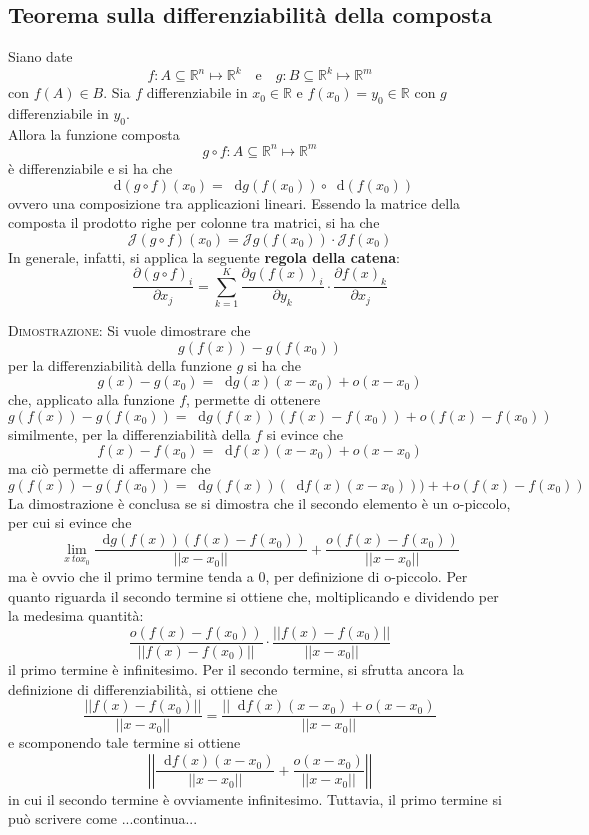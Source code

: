 \documentclass[a4paper]{extarticle}
\newcommand*\dif{\mathop{}\!\mathrm{d}}
\begin{document}
\vspace{1em}
\noindent
\subsection{Teorema sulla differenziabilità della composta}
Siano date
\[f : A \subseteq \mathbb{R}^n \longmapsto \mathbb{R}^k \hspace{1em} \text{e} \hspace{1em} g : B \subseteq \mathbb{R}^k \longmapsto \mathbb{R}^m\]
con $f(A) \in B$. Sia $f$ differenziabile in $x_0 \in \mathbb{R}$ e $f(x_0)=y_0 \in \mathbb{R}$ con $g$ differenziabile in $y_0$.\\
Allora la funzione composta
\[g \circ f : A \subseteq \mathbb{R}^n \longmapsto \mathbb{R}^m\]
è differenziabile e si ha che
\[\dif(g \circ f)(x_0) = \dif g(f(x_0)) \circ \dif(f(x_0))\]
ovvero una composizione tra applicazioni lineari. Essendo la matrice della composta il prodotto righe per colonne tra matrici, si ha che
\[\mathcal{J}(g \circ f)(x_0) = \mathcal{J}g(f(x_0)) \cdot \mathcal{J}f(x_0)\]
In generale, infatti, si applica la seguente \textbf{regola della catena}:
\[\frac{\partial (g \circ f)_i}{\partial x_j} = \sum_{k=1}^K \frac{\partial g(f(x))_i}{\partial y_k} \cdot \frac{\partial f(x)_k}{\partial x_j}\]

\vspace{2em}
\noindent
\normalfont \normalsize
\textsc{Dimostrazione}: Si vuole dimostrare che
\[g(f(x))-g(f(x_0))\]
per la differenziabilità della funzione $g$ si ha che
\[g(x) - g(x_0) = \dif g(x)(x-x_0) + o(x-x_0)\]
che, applicato alla funzione $f$, permette di ottenere
\[g(f(x)) - g(f(x_0)) = \dif g(f(x))(f(x)-f(x_0)) + o(f(x)-f(x_0))\]
similmente, per la differenziabilità della $f$ si evince che
\[f(x) - f(x_0) = \dif f(x)(x-x_0) + o(x-x_0)\]
ma ciò permette di affermare che
\[g(f(x)) - g(f(x_0)) = \dif g(f(x))(\dif f(x) (x-x_0))) + + o(f(x)-f(x_0))\]
La dimostrazione è conclusa se si dimostra che il secondo elemento è un o-piccolo, per cui si evince che
\[\lim_{x\ to x_0} \frac{\dif g(f(x))(f(x)-f(x_0))}{\vert \vert x-x_0 \vert \vert} + \frac{o \left(f(x)-f(x_0)\right)}{\vert \vert x-x_0 \vert \vert}\]
ma è ovvio che il primo termine tenda a $0$, per definizione di o-piccolo. Per quanto riguarda il secondo termine si ottiene che, moltiplicando e dividendo per la medesima quantità:
\[\frac{o \left(f(x)-f(x_0)\right)}{\vert \vert f(x) - f(x_0) \vert \vert} \cdot \frac{\vert \vert f(x) - f(x_0) \vert \vert}{\vert \vert x - x_0 \vert \vert}\]
il primo termine è infinitesimo. Per il secondo termine, si sfrutta ancora la definizione di differenziabilità, si ottiene che
\[\frac{\vert \vert f(x) - f(x_0) \vert \vert}{\vert \vert x - x_0 \vert \vert} = \frac{\vert \vert \dif f(x)(x-x_0) + o(x-x_0)}{\vert \vert x-x_0\vert \vert}\]
e scomponendo tale termine si ottiene
\[\left \vert \left \vert \frac{\dif f(x)(x-x_0)}{\vert \vert x-x_0\vert\vert} + \frac{o(x-x_0)}{\vert \vert x-x_0 \vert \vert}\right \vert \right \vert\]
in cui il secondo termine è ovviamente infinitesimo. Tuttavia, il primo termine si può scrivere come ...continua...
\end{document}
